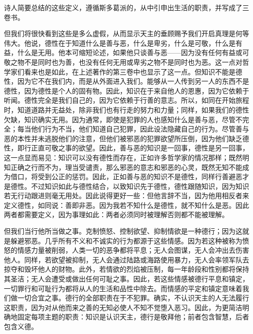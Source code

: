 诗人简要总结的这些定义，遵循斯多葛派的，从中引申出生活的职责，并写成了三卷书。\par

但我们将很快看到这些是多么虚假，从而显示天主的垂顾赐予我们开启真理是何等伟大。他说，德性在于知道什么是善与恶，什么是卑劣，什么是可敬，什么是有益，什么是无用。他本可缩短论述，如果他只谈善与恶——因为没有任何有益或可敬之物不是同时也为善，也没有任何无用或卑劣之物不是同时也为恶。这一点对哲学家们看来也是如此，在上述著作的第三卷中也显示了这一点。但知识不能是德性，因为它不在我们内，而是从外面进入我们。能够从一人传到另一人的东西不是德性，因为德性是个人的固有物。因此，知识在于来自他人的恩惠，因为它依赖于听闻。德性完全是我们自己的，因为它依赖于行善的意志。所以，如同在开始旅程时，知道道路并无益处，除非我们也有行走的努力和力量；同样，如果我们的德性欠缺，知识确实无用。因为通常，即使是犯罪的人也感知什么是善与恶，尽管不完全；每当他们行为不当，他们知道自己犯罪，因此设法隐藏自己的行为。尽管善与恶的本性并未逃脱他们的注意，但他们被邪恶的犯罪欲望所压倒，因为他们缺乏德性，即行正直可敬之事的欲望。因此，善与恶的知识是一回事，德性是另一回事，这一点显而易见：知识可以没有德性而存在，正如许多哲学家的情况那样；既然明知正确之行而不为，理当受谴责，那么邪恶的意志和邪恶的心灵，既然无知不能成为借口，将受到公正的惩罚。因此，正如善与恶的知识不是德性，同样行善避恶才是德性。不过知识如此与德性结合，以致知识先于德性，德性跟随知识，因为知识若无行动跟进则毫无用处。因此说得更好一些：但他言辞不当，因为他用相反者来定义德性，如同说：善即非恶。因为我若不知什么是德性，就不知什么是恶。因此两者都需要定义，因为事理如此：两者必须同时被理解否则都不能被理解。\par

但我们当行他所当做之事。克制愤怒、控制欲望、抑制情欲是一种德行；因为这就是躲避邪恶。几乎所有不义和不诚实的行为都源于这些情感。因为若这种被称为愤怒的情感力量被削弱，人类一切的恶争都将平息；无人会图谋，无人会冲出去伤害他人。同样，若欲望被抑制，无人会通过陆路或海路使用暴力，无人会率领军队去掠夺和毁坏他人的财物。此外，若情欲的烈焰被压制，每一年龄段和性别都将保持其圣洁；无人会遭受或做出任何可耻之事。因此，若这些情感被德行平息和镇定，一切罪行和可耻行为都将从人的生活和品性中除去。而情感的平定和镇定意味着我们做一切合宜之事。德行的全部职责在于不犯罪。确实，不认识天主的人无法履行这职责，因为对从他而来之善的无知必使人不知不觉堕入恶习。因此，为更简洁明确地固定每项主题的职责：知识是认识天主，德行是敬拜他；前者包含智慧，后者包含义德。\par


